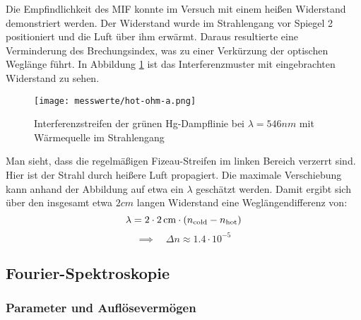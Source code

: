 			Die Empfindlichkeit des MIF konnte im Versuch mit einem heißen Widerstand demonstriert werden.
			Der Widerstand wurde im Strahlengang vor Spiegel 2 positioniert und die Luft über ihm erwärmt.
			Daraus resultierte eine Verminderung des Brechungsindex, was zu einer Verkürzung der optischen Weglänge führt.
			In Abbildung \ref{fig:hot ohm a} ist das Interferenzmuster mit eingebrachten Widerstand zu sehen.

			\begin{figure}[htb]
				\centering
				\texttt{[image: messwerte/hot-ohm-a.png]}
				\caption{Interferenzstreifen der grünen Hg-Dampflinie bei $\lambda = 546 \unit{nm}$ mit Wärmequelle im Strahlengang}
				\label{fig:hot ohm a}
			\end{figure}

			Man sieht, dass die regelmäßigen Fizeau-Streifen im linken Bereich verzerrt sind.
			Hier ist der Strahl durch heißere Luft propagiert.
			Die maximale Verschiebung kann anhand der Abbildung auf etwa ein $\lambda$ geschätzt werden.
			Damit ergibt sich über den insgesamt etwa $2 \unit{cm}$ langen Widerstand eine Weglängendifferenz von:
			\[ \lambda = 2\cdot 2 \, \mathrm{cm} \cdot (n_{\mathrm{cold}} - n_{\mathrm{hot}}) \]
			\[ \implies \quad \Delta n \approx 1.4\cdot 10^{-5} \]



	\subsection{Fourier-Spektroskopie} %
	\label{sub:fourier_spektroskopie}

		\subsubsection{Parameter und Auflösevermögen} %
		\label{ssub:parameter_und_aufl_severm_gen}

